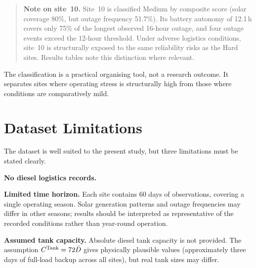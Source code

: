 \begin{quote}
\textbf{Note on site~10.}
Site~10 is classified Medium by composite score (solar coverage 80\%, but
outage frequency 51.7\%).  Its battery autonomy of 12.1\,h covers only
75\% of the longest observed 16-hour outage, and four outage events exceed
the 12-hour threshold.  Under adverse logistics conditions, site~10 is
structurally exposed to the same reliability risks as the Hard sites.
Results tables note this distinction where relevant.
\end{quote}

The classification is a practical organising tool, not a research outcome.
It separates sites where operating stress is structurally high
from those where conditions are comparatively mild.


\section{Dataset Limitations}
\label{sec:dataset_limitations}

The dataset is well suited to the present study, but three limitations must
be stated clearly.

\textbf{No diesel logistics records.}

\textbf{Limited time horizon.}
Each site contains 60 days of observations, covering a single operating
season.  Solar generation patterns and outage frequencies may differ in other
seasons; results should be interpreted as representative of the recorded
conditions rather than year-round operation.

\textbf{Assumed tank capacity.}
Absolute diesel tank capacity is not provided.  The assumption
$C^{\mathrm{Tank}} = 72\bar{D}$ gives physically plausible values (approximately
three days of full-load backup across all sites), but real tank sizes may
differ.  


